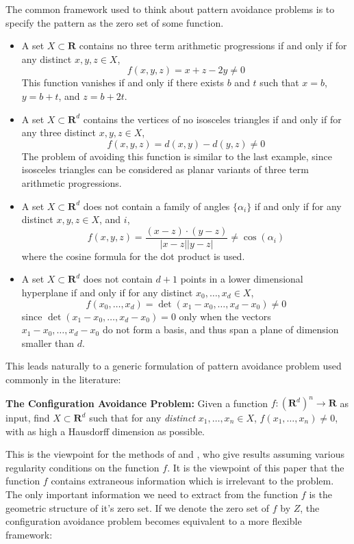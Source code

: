 \documentclass{article}
\theoremstyle{plain}
\theoremstyle{plain}
\begin{document}
The common framework used to think about pattern avoidance problems is to specify the pattern as the zero set of some function.
%
\begin{itemize}
	\item A set $X \subset \mathbf{R}$ contains no three term arithmetic progressions if and only if for any distinct $x,y,z \in X$,
	\[ f(x,y,z) = x + z - 2y \neq 0  \]
	This function vanishes if and only if there exists $b$ and $t$ such that $x = b$, $y = b+t$, and $z = b+2t$.

	\item A set $X \subset \mathbf{R}^d$ contains the vertices of no isosceles triangles if and only if for any three distinct $x,y,z \in X$,
	\[ f(x,y,z) = d(x,y) - d(y,z) \neq 0 \]
	The problem of avoiding this function is similar to the last example, since isosceles triangles can be considered as planar variants of three term arithmetic progressions.

	\item A set $X \subset \mathbf{R}^d$ does not contain a family of angles $\{ \alpha_i \}$ if and only if for any distinct $x,y,z \in X$, and $i$,
	\[ f(x,y,z) = \frac{(x - z) \cdot (y - z)}{|x - z||y - z|} \neq \cos(\alpha_i) \]
	where the cosine formula for the dot product is used.

	\item A set $X \subset \mathbf{R}^d$ does not contain $d+1$ points in a lower dimensional hyperplane if and only if for any distinct $x_0, \dots, x_d \in X$,
	\[ f(x_0, \dots, x_d) = \det(x_1 - x_0, \dots, x_d - x_0) \neq 0 \]
	since $\det(x_1 - x_0, \dots, x_d - x_0) = 0$ only when the vectors $x_1 - x_0, \dots, x_d - x_0$ do not form a basis, and thus span a plane of dimension smaller than $d$.
\end{itemize}
%
This leads naturally to a generic formulation of pattern avoidance problem used commonly in the literature:

\begin{changemargin}{0.5em}{0em}
{\bf The Configuration Avoidance Problem:} Given a function $f: (\mathbf{R}^d)^n \to \mathbf{R}$ as input, find $X \subset \mathbf{R}^d$ such that for any {\it distinct} $x_1, \dots, x_n \in X$, $f(x_1, \dots, x_n) \neq 0$, with as high a Hausdorff dimension as possible.
\end{changemargin}

This is the viewpoint for the methods of \cite{MalabikaRob} and \cite{Mathe}, who give results assuming various regularity conditions on the function $f$. It is the viewpoint of this paper that the function $f$ contains extraneous information which is irrelevant to the problem. The only important information we need to extract from the function $f$ is the geometric structure of it's zero set. If we denote the zero set of $f$ by $Z$, the configuration avoidance problem becomes equivalent to a more flexible framework:
\end{document}
